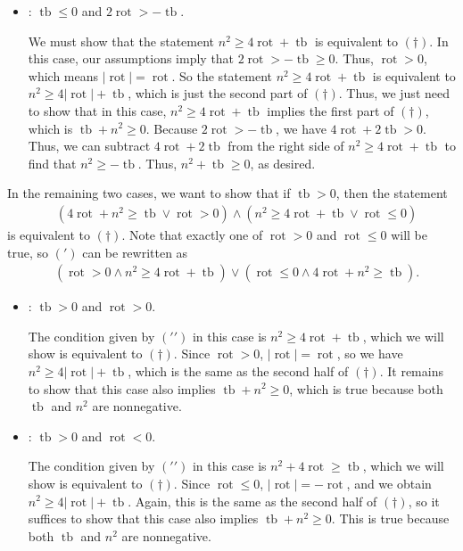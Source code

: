 \documentclass{article}
\DeclareMathOperator{\tb}{tb}
\DeclareMathOperator{\rot}{rot}
\begin{document}
\begin{itemize}
\item[\textbf{Case (1.3)}]: $\tb\leq0$ and $2\rot>-\tb$.

We must show that the statement $n^2\geq4\rot+\tb$ is equivalent to $(\dagger)$. In this case, our assumptions imply that $2\rot>-\tb\geq0$. Thus, $\rot>0$, which means $|\rot|=\rot$. So the statement $n^2\geq4\rot+\tb$ is equivalent to $n^2\geq4|\rot|+\tb$, which is just the second part of $(\dagger)$. Thus, we just need to show that in this case, $n^2\geq4\rot+\tb$ implies the first part of $(\dagger)$, which is $\tb+n^2\geq0$. Because $2\rot>-\tb$, we have $4\rot+2\tb>0$. Thus, we can subtract $4\rot+2\tb$ from the right side of $n^2\geq4\rot+\tb$ to find that $n^2\geq-\tb$. Thus, $n^2+\tb\geq0$, as desired.

\end{itemize}

In the remaining two cases, we want to show that if $\tb>0$, then the statement 
\begin{align*}
    &(4 \rot + n^2 \geq \tb \vee 
     \rot > 0) \wedge (n^2 \geq 4 \rot + \tb \vee \rot \leq 0)\tag{$\prime$}
\end{align*}
is equivalent to $(\dagger)$. Note that exactly one of $\rot>0$ and $\rot\leq0$ will be true, so $(\prime)$ can be rewritten as
\begin{align*}
    &(\rot>0\wedge n^2 \geq 4 \rot + \tb)\vee(\rot\leq0\wedge4 \rot + n^2 \geq \tb).\tag{$\prime\prime$}
\end{align*}


\begin{itemize}


\item[\textbf{Case (2.1)}]: $\tb>0$ and $\rot>0$.



The condition given by $(\prime\prime)$ in this case is $n^2 \geq 4 \rot + \tb$, which we will show is equivalent to $(\dagger)$. Since $\rot>0$, $|\rot|=\rot$, so we have $n^2 \geq 4|\rot| + \tb$, which  is the same as the second half of $(\dagger)$.  It remains to show that this case also implies $\tb+n^2\geq0$, which is true because both $\tb$ and $n^2$ are nonnegative.

\item[\textbf{Case (2.2)}]: $\tb>0$ and $\rot<0$.

The condition given by $(\prime\prime)$ in this case is $n^2+4\rot \geq \tb$, which we will show is equivalent to $(\dagger)$. Since $\rot\leq0$, $|\rot|=-\rot$, and we obtain  $n^2 \geq 4|\rot| + \tb$. Again, this is the same as the second half of $(\dagger)$, so it suffices to show that this case also implies $\tb+n^2\geq0$. This is true because both $\tb$ and $n^2$ are nonnegative.

\end{itemize}
\end{document}
